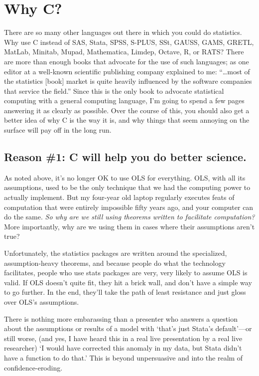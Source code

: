\section{Why C?}

There are so many other languages out there in which you could do
statistics. Why use C instead of SAS, Stata, SPSS, S-PLUS, SSt, GAUSS, GAMS, GRETL,
MatLab, Minitab, Mupad, Mathematica, Limdep, Octave, R, or RATS? 
There are more than enough books that advocate for the use of such
languages; 
as one editor at a well-known scientific publishing company
explained to me: ``\dots most of the statistics [book] market is quite heavily
influenced by the software companies that service the
field.''  Since this is the only book to advocate statistical computing
with a general computing language, I'm going to spend a few pages
answering it as clearly as possible. Over the course of this, you should
also get a better idea of why C is the way it is, and why things that
seem annoying on the surface will pay off in the long run.
\ifbook
\subsection{Reason \#1: C will help you do better science.}
As noted above, it's no longer OK to use OLS for everything.
OLS, with all its assumptions, used to be the only technique that we had the computing
power to actually implement. But my four-year old laptop regularly executes
feats of computation that were entirely impossible fifty years ago, and your
computer can do the same.  {\it So why are
we still using theorems written to facilitate computation?} More importantly, why
are we using them in cases where their assumptions aren't true?

Unfortunately, the statistics packages are written around the
specialized, assumption-heavy theorems, and because people do what the
technology facilitates, people who use stats packages are very, very
likely to assume OLS is valid.  If OLS doesn't quite fit, they hit a
brick wall, and don't have a simple way to go further. In the end, they'll
take the path of least resistance and just gloss over OLS's assumptions.

There is nothing more embarassing than a presenter who answers a question
about the assumptions or results of a model with `that's just Stata's
default'---or still worse, (and yes, I have heard this in a real live
presentation by a real live researcher) `I would have corrected this
anomaly in my data, but Stata didn't have a function to do that.' This
is beyond unpersuasive and into the realm of confidence-eroding.

